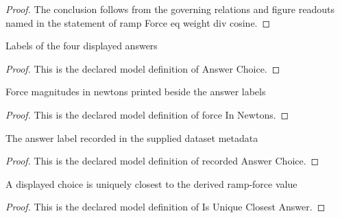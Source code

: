 \begin{proof}
  The conclusion follows from the governing relations and figure readouts named in the statement of ramp Force eq weight div cosine.
\end{proof}
\begin{definition}
  \label{def:physics:phyx-mini-0759:phyxminiproblems-problemphyxmini0759-answerchoice}
  Labels of the four displayed answers
\end{definition}
\begin{proof}
  This is the declared model definition of Answer Choice.
\end{proof}
\begin{definition}
  \label{def:physics:phyx-mini-0759:phyxminiproblems-problemphyxmini0759-answerchoice-forceinnewtons}
  Force magnitudes in newtons printed beside the answer labels
\end{definition}
\begin{proof}
  This is the declared model definition of force In Newtons.
\end{proof}
\begin{definition}
  \label{def:physics:phyx-mini-0759:phyxminiproblems-problemphyxmini0759-recordedanswerchoice}
  The answer label recorded in the supplied dataset metadata
\end{definition}
\begin{proof}
  This is the declared model definition of recorded Answer Choice.
\end{proof}
\begin{definition}
  \label{def:physics:phyx-mini-0759:phyxminiproblems-problemphyxmini0759-isuniqueclosestanswer}
  A displayed choice is uniquely closest to the derived ramp-force value
\end{definition}
\begin{proof}
  This is the declared model definition of Is Unique Closest Answer.
\end{proof}
